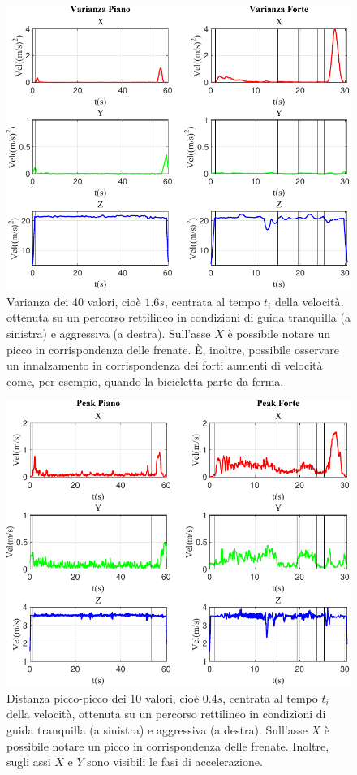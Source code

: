 \documentclass[class=article]{standalone}
\begin{document}
	\begin{center}
		\begin{figure}[h!]
			\centering\includegraphics[width=.7\textwidth]{img/lungaFP/Vel/Varianza}
			\caption[]{Varianza dei 40 valori, cioè \(1.6s\), centrata al tempo \(t_{i}\) della velocità, ottenuta su un percorso rettilineo in condizioni di guida tranquilla (a sinistra) e aggressiva (a destra). Sull'asse \(X\) è possibile notare un picco in corrispondenza delle frenate. È, inoltre, possibile osservare un innalzamento in corrispondenza dei forti aumenti di velocità come, per esempio, quando la bicicletta parte da ferma.}
			\label{fig:VelVar_lungaFP}
		\end{figure}
	\end{center}
	
	\begin{center}
		\begin{figure}[h!]
			\centering\includegraphics[width=.7\textwidth]{img/lungaFP/Vel/Peak}
			\caption[]{Distanza picco-picco dei 10 valori, cioè \(0.4s\), centrata al tempo \(t_{i}\) della velocità, ottenuta su un percorso rettilineo in condizioni di guida tranquilla (a sinistra) e aggressiva (a destra). Sull'asse \(X\) è possibile notare un picco in corrispondenza delle frenate. Inoltre, sugli assi \(X\) e \(Y\) sono visibili le fasi di accelerazione.}
			\label{fig:VelPeak_lungaFP}
		\end{figure}
	\end{center}
	
\end{document}
